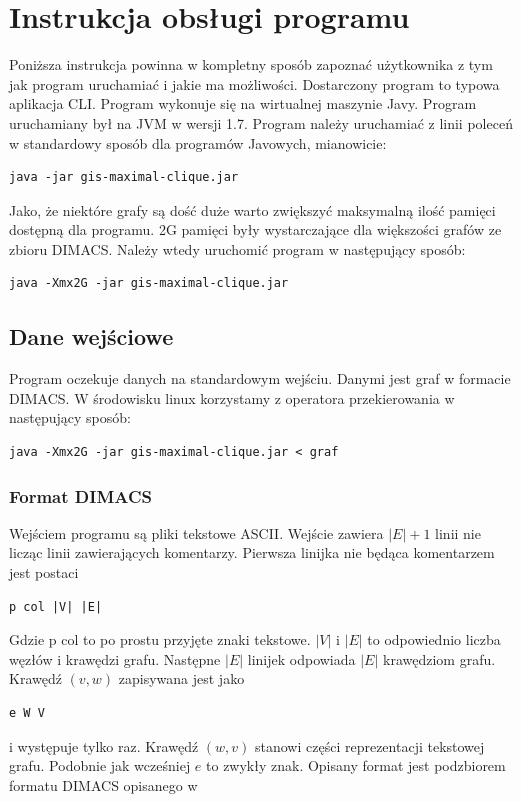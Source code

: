 \documentclass[12pt, a4paper]{article}
\begin{document}
\section{Instrukcja obsługi programu}
Poniższa instrukcja powinna w kompletny sposób zapoznać użytkownika z tym jak program uruchamiać i jakie ma możliwości. Dostarczony program to typowa aplikacja CLI. Program wykonuje się na wirtualnej maszynie Javy. Program uruchamiany był na JVM w wersji 1.7. Program należy uruchamiać z linii poleceń w standardowy sposób dla programów Javowych, mianowicie:

\begin{verbatim}
java -jar gis-maximal-clique.jar
\end{verbatim}

Jako, że niektóre grafy są dość duże warto zwiększyć maksymalną ilość pamięci dostępną dla programu. 2G pamięci były wystarczające dla większości grafów ze zbioru DIMACS. Należy wtedy uruchomić program w następujący sposób:

\begin{verbatim}
java -Xmx2G -jar gis-maximal-clique.jar
\end{verbatim}

\subsection{Dane wejściowe}
Program oczekuje danych na standardowym wejściu. Danymi jest graf w formacie DIMACS. W środowisku linux korzystamy z operatora przekierowania w następujący sposób:

\begin{verbatim}
java -Xmx2G -jar gis-maximal-clique.jar < graf
\end{verbatim}

\subsubsection{Format DIMACS}

Wejściem programu są pliki tekstowe ASCII. Wejście zawiera $|E|+1$ linii nie licząc linii zawierających komentarzy. Pierwsza linijka nie będąca komentarzem jest postaci 
\begin{verbatim}
p col |V| |E|
\end{verbatim}
Gdzie $\text{p col}$ to po prostu przyjęte znaki tekstowe. $|V|$ i $|E|$ to odpowiednio liczba węzłów i krawędzi grafu. Następne $|E|$ linijek odpowiada $|E|$ krawędziom grafu. Krawędź $(v, w)$ zapisywana jest jako 
\begin{verbatim}
e W V
\end{verbatim}
i występuje tylko raz. Krawędź $(w, v)$ stanowi części reprezentacji tekstowej grafu. Podobnie jak wcześniej $e$ to zwykły znak. Opisany format jest podzbiorem formatu DIMACS opisanego w \cite{dimacs_format}
\end{document}
